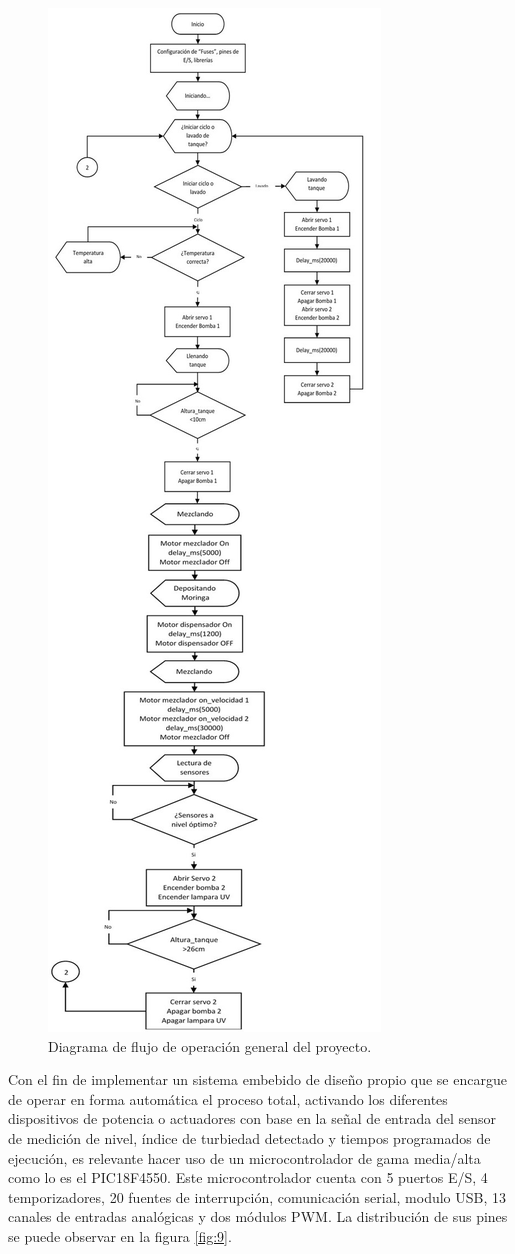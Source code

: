 \documentclass[conference]{IEEEtran}
\begin{document}
	\begin{figure}[!htbp]
		\centering
		\includegraphics[width=0.6\columnwidth]{fig8.jpg}
		\caption{Diagrama de flujo de operación general del proyecto.}
		\label{fig:8}
	\end{figure}

	Con el fin de implementar un sistema embebido de diseño propio que se encargue de operar en forma automática el proceso total, activando los diferentes dispositivos de potencia o actuadores con base en la señal de entrada del sensor de medición de nivel, índice de turbiedad detectado y tiempos programados de ejecución, es relevante hacer uso de un microcontrolador de gama media/alta como lo es el PIC18F4550. Este microcontrolador cuenta con 5 puertos E/S, 4 temporizadores, 20 fuentes de interrupción, comunicación serial, modulo USB, 13 canales de entradas analógicas y dos módulos PWM. La distribución de sus pines se puede observar en la figura \ref{fig:9}.
	
\end{document}

